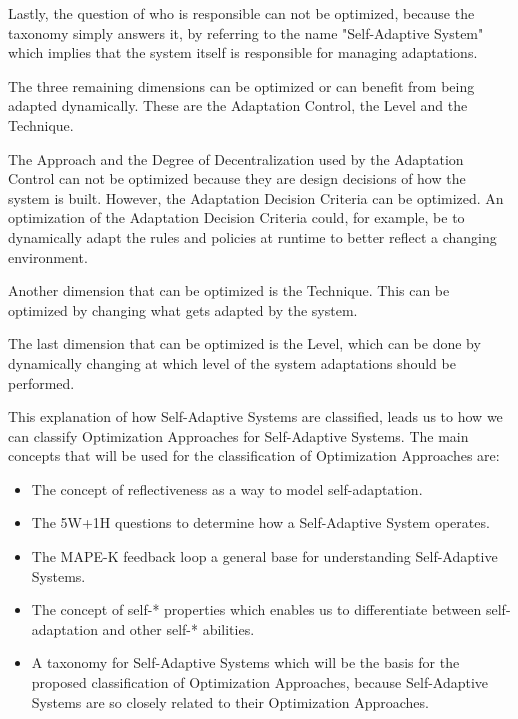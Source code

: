 Lastly, the question of who is responsible can not be optimized, because the taxonomy simply answers it,
by referring to the name "Self-Adaptive System" which implies that the system itself is responsible for managing adaptations.
\newline
\par


The three remaining dimensions can be optimized or can benefit from being adapted dynamically.
These are the Adaptation Control, the Level and the Technique.
\newline
\par

The Approach and the Degree of Decentralization used by the Adaptation Control can not be optimized 
because they are design decisions of how the system is built.
However, the Adaptation Decision Criteria can be optimized. An optimization of the Adaptation Decision Criteria
could, for example, be to dynamically adapt the rules and policies at runtime to better reflect a changing environment.
\newline
\par

Another dimension that can be optimized is the Technique. 
This can be optimized by changing what gets adapted by the system.
\newline
\par

The last dimension that can be optimized is the Level, which can be done by dynamically changing at which level of the system
adaptations should be performed.
\newline
\par


This explanation of how Self-Adaptive Systems are classified,
leads us to how we can classify Optimization Approaches for Self-Adaptive Systems.
The main concepts that will be used for the classification of Optimization Approaches are:
\begin{itemize}
    \item The concept of reflectiveness as a way to model self-adaptation.
    \item The 5W+1H questions to determine how a Self-Adaptive System operates.
    \item The MAPE-K feedback loop a general base for understanding Self-Adaptive Systems.
    \item The concept of self-* properties which enables us to differentiate between self-adaptation
    and other self-* abilities.
    \item A taxonomy for Self-Adaptive Systems which will be the basis for the proposed classification of Optimization Approaches,
    because Self-Adaptive Systems are so closely related to their Optimization Approaches.
\end{itemize}
